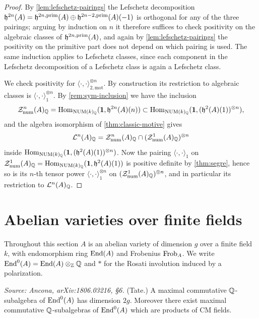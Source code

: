\begin{proof}
  By \cref{lem:lefschetz-pairings} the Lefschetz decomposition
  \(\mathfrak{h}^{2n}(A) = \mathfrak{h}^{2n,\mathrm{prim}}(A) \oplus \mathfrak{h}^{2n-2,\mathrm{prim}}(A)(-1)\) is orthogonal
  for any of the three pairings; arguing by induction on \(n\) it therefore
  suffices to check positivity on the algebraic classes of \(\mathfrak{h}^{2n,\mathrm{prim}}(A)\),
  and again by \cref{lem:lefschetz-pairings} the positivity on the primitive
  part does not depend on which pairing is used. The same induction applies to
  Lefschetz classes, since each component in the Lefschetz decomposition of a
  Lefschetz class is again a Lefschetz class.

  We check positivity for \(\langle \cdot, \cdot \rangle_{2,\mathrm{mot}}^{\otimes
  n}\). By construction its restriction to algebraic classes is
  \(\langle \cdot, \cdot \rangle_{1}^{\otimes n}\). By
  \cref{rem:sym-inclusion} we have the inclusion
  \[\mathcal{Z}^n_{\mathrm{num}}(A)_{\mathbb{Q}} = \mathrm{Hom}_{\mathrm{NUM}(k)_{\mathbb{Q}}}(\mathbf{1}, \mathfrak{h}^{2n}(A)(n))
    \subset \mathrm{Hom}_{\mathrm{NUM}(k)_{\mathbb{Q}}}(\mathbf{1}, (\mathfrak{h}^2(A)(1))^{\otimes n}),\]
  and the algebra isomorphism of \cref{thm:classic-motive} gives
  \[\mathcal{L}^{n}(A)_{\mathbb{Q}} =
    \mathcal{Z}^n_{\mathrm{num}}(A)_{\mathbb{Q}} \cap (\mathcal{Z}^1_{\mathrm{num}}(A)_{\mathbb{Q}})^{\otimes n}\]
  inside \(\mathrm{Hom}_{\mathrm{NUM}(k)_{\mathbb{Q}}}(\mathbf{1}, (\mathfrak{h}^2(A)(1))^{\otimes n})\). Now the pairing
  \(\langle \cdot, \cdot \rangle_1\) on
  \(\mathcal{Z}^1_{\mathrm{num}}(A)_{\mathbb{Q}} = \mathrm{Hom}_{\mathrm{NUM}(k)_{\mathbb{Q}}}(\mathbf{1}, \mathfrak{h}^2(A)(1))\) is
  positive definite by \cref{thm:segre}, hence so is its \(n\)-th tensor power
  \(\langle \cdot, \cdot \rangle_1^{\otimes n}\) on
  \((\mathcal{Z}^1_{\mathrm{num}}(A)_{\mathbb{Q}})^{\otimes n}\), and in particular its
  restriction to \(\mathcal{L}^{n}(A)_{\mathbb{Q}}\).
\end{proof}

\section*{Abelian varieties over finite fields}

Throughout this section \(A\) is an abelian variety of dimension \(g\) over a
finite field \(k\), with endomorphism ring \(\mathrm{End}(A)\) and Frobenius
\(\mathrm{Frob}_A\). We write \(\mathrm{End}^0(A) = \mathrm{End}(A) \otimes_{\mathbb{Z}} \mathbb{Q}\) and \(*\) for the
Rosati involution induced by a polarization.

\begin{theorem}
  \label{thm:tate}
  \textit{Source: Ancona, arXiv:1806.03216, §6.}
  (Tate.) A maximal commutative \(\mathbb{Q}\)-subalgebra of \(\mathrm{End}^0(A)\) has dimension
  \(2g\). Moreover there exist maximal commutative \(\mathbb{Q}\)-subalgebras of
  \(\mathrm{End}^0(A)\) which are products of CM fields.
\end{theorem}

